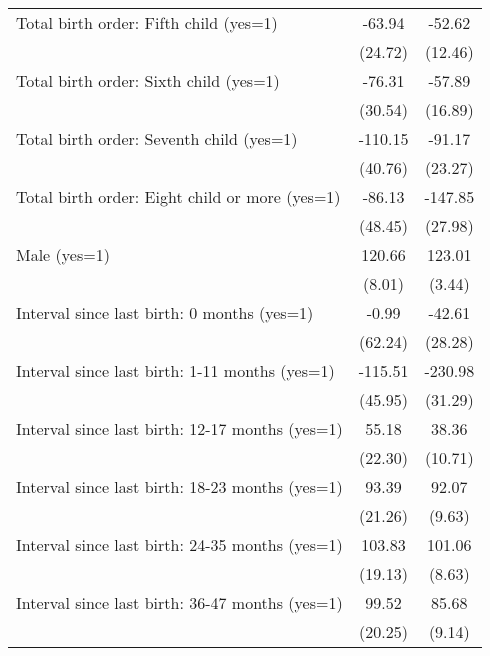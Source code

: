 \begin{tabular}{l*{2}{c}}
Total birth order: Fifth child (yes=1)            &      -63.94&      -52.62\\
                                                  &     (24.72)&     (12.46)\\
Total birth order: Sixth child (yes=1)            &      -76.31&      -57.89\\
                                                  &     (30.54)&     (16.89)\\
Total birth order: Seventh child (yes=1)          &     -110.15&      -91.17\\
                                                  &     (40.76)&     (23.27)\\
Total birth order: Eight child or more (yes=1)    &      -86.13&     -147.85\\
                                                  &     (48.45)&     (27.98)\\
Male (yes=1)                                      &      120.66&      123.01\\
                                                  &      (8.01)&      (3.44)\\
Interval since last birth: 0 months (yes=1)       &       -0.99&      -42.61\\
                                                  &     (62.24)&     (28.28)\\
Interval since last birth: 1-11 months (yes=1)    &     -115.51&     -230.98\\
                                                  &     (45.95)&     (31.29)\\
Interval since last birth: 12-17 months (yes=1)   &       55.18&       38.36\\
                                                  &     (22.30)&     (10.71)\\
Interval since last birth: 18-23 months (yes=1)   &       93.39&       92.07\\
                                                  &     (21.26)&      (9.63)\\
Interval since last birth: 24-35 months (yes=1)   &      103.83&      101.06\\
                                                  &     (19.13)&      (8.63)\\
Interval since last birth: 36-47 months (yes=1)   &       99.52&       85.68\\
                                                  &     (20.25)&      (9.14)\\

\end{tabular}

